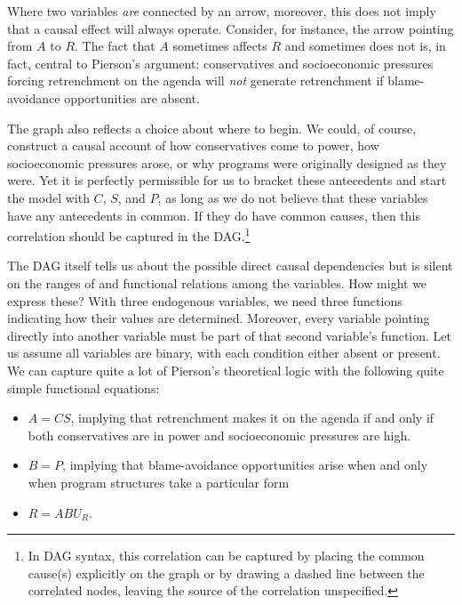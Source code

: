 \documentclass[
  12pt,
]{book}
\providecommand{\tightlist}{%
  \setlength{\itemsep}{0pt}\setlength{\parskip}{0pt}}
\begin{document}
Where two variables \emph{are} connected by an arrow, moreover, this does not imply that a causal effect will always operate. Consider, for instance, the arrow pointing from \(A\) to \(R\). The fact that \(A\) sometimes affects \(R\) and sometimes does not is, in fact, central to Pierson's argument: conservatives and socioeconomic pressures forcing retrenchment on the agenda will \emph{not} generate retrenchment if blame-avoidance opportunities are absent.

The graph also reflects a choice about where to begin. We could, of course, construct a causal account of how conservatives come to power, how socioeconomic pressures arose, or why programs were originally designed as they were. Yet it is perfectly permissible for us to bracket these antecedents and start the model with \(C\), \(S\), and \(P\), as long as we do not believe that these variables have any antecedents in common. If they do have common causes, then this correlation should be captured in the DAG.\footnote{In DAG syntax, this correlation can be captured by placing the common cause(s) explicitly on the graph or by drawing a dashed line between the correlated nodes, leaving the source of the correlation unspecified.}

The DAG itself tells us about the possible direct causal dependencies but is silent on the ranges of and functional relations among the variables. How might we express these? With three endogenous variables, we need three functions indicating how their values are determined. Moreover, every variable pointing directly into another variable must be part of that second variable's function. Let us assume all variables are binary, with each condition either absent or present. We can capture quite a lot of Pierson's theoretical logic with the following quite simple functional equations:

\begin{itemize}
\tightlist
\item
  \(A=CS\), implying that retrenchment makes it on the agenda if and only if both conservatives are in power and socioeconomic pressures are high.
\item
  \(B=P\), implying that blame-avoidance opportunities arise when and only when program structures take a particular form
\item
  \(R=ABU_R\).
\end{itemize}
\end{document}
